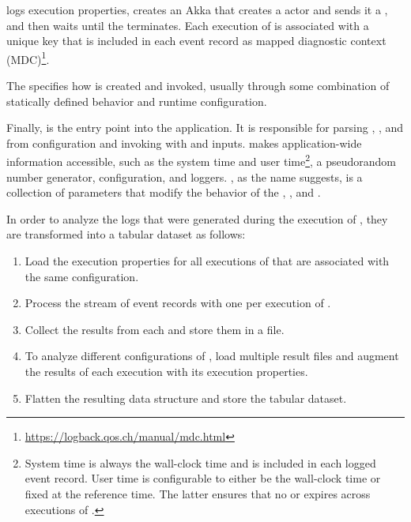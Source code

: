  logs execution properties, creates an Akka  that creates a  actor and sends it a , and then waits until the  terminates. Each execution of  is associated with a unique key that is included in each event record as mapped diagnostic context (MDC)\footnote{\url{https://logback.qos.ch/manual/mdc.html}}.

The  specifies how  is created and invoked, usually through some combination of statically defined behavior and runtime configuration.

Finally,  is the entry point into the application. It is responsible for parsing , , and  from configuration and invoking  with  and  inputs.  makes application-wide information accessible, such as the system time and user time\footnote{System time is always the wall-clock time and is included in each logged event record. User time is configurable to either be the wall-clock time or fixed at the reference time. The latter ensures that no  or  expires across executions of .}, a pseudorandom number generator,  configuration, and loggers. , as the name suggests, is a collection of parameters that modify the behavior of the , , and .

In order to analyze the logs that were generated during the execution of , they are transformed into a tabular dataset as follows:
\begin{enumerate}
  \item Load the execution properties for all executions of  that are associated with the same configuration.
  \item Process the stream of event records with one  per execution of .
  \item Collect the results from each  and store them in a file.
  \item To analyze different configurations of , load multiple result files and augment the results of each  execution with its execution properties.
  \item Flatten the resulting data structure and store the tabular dataset.
\end{enumerate}

